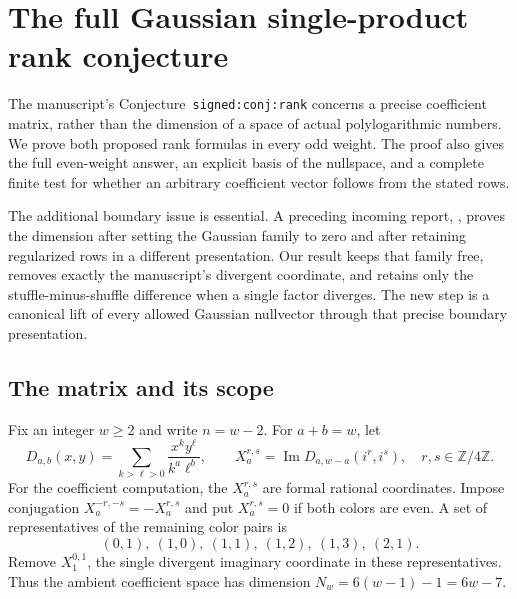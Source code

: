 \section{The full Gaussian single-product rank conjecture}
\label{fg:sec:rank}

The manuscript's Conjecture~\texttt{signed:conj:rank} concerns a precise
coefficient matrix, rather than the dimension of a space of actual
polylogarithmic numbers. We prove both proposed rank formulas in every
odd weight. The proof also gives the full even-weight answer, an explicit
basis of the nullspace, and a complete finite test for whether an arbitrary
coefficient vector follows from the stated rows.

The additional boundary issue is essential. A preceding incoming report,
, proves the dimension after
setting the Gaussian family to zero and after retaining regularized rows
in a different presentation. Our result keeps that family free, removes
exactly the manuscript's divergent coordinate, and retains only the
stuffle-minus-shuffle difference when a single factor diverges. The new
step is a canonical lift of every allowed Gaussian nullvector through
that precise boundary presentation.

\subsection{The matrix and its scope}

Fix an integer $w\ge2$ and write $n=w-2$. For $a+b=w$, let
\[
 D_{a,b}(x,y)=\sum_{k>\ell>0}\frac{x^ky^\ell}{k^a\ell^b},
 \qquad X_a^{r,s}=\operatorname{Im}D_{a,w-a}(i^r,i^s),
 \quad r,s\in\mathbb Z/4\mathbb Z.
\]
For the coefficient computation, the $X_a^{r,s}$ are formal rational
coordinates. Impose conjugation
$X_a^{-r,-s}=-X_a^{r,s}$ and put $X_a^{r,s}=0$ if both colors are even.
A set of representatives of the remaining color pairs is
\begin{equation}\label{fg:eq:pairs}
 (0,1),\ (1,0),\ (1,1),\ (1,2),\ (1,3),\ (2,1).
\end{equation}
Remove $X_1^{0,1}$, the single divergent imaginary coordinate in these
representatives. Thus the ambient coefficient space has dimension
$N_w=6(w-1)-1=6w-7$.

